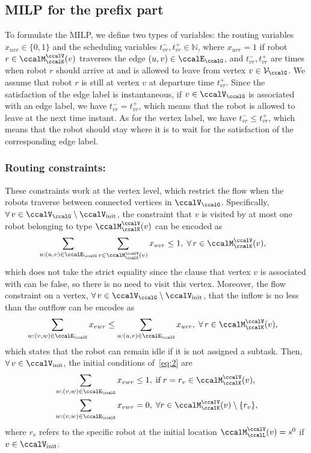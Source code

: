 \documentclass[Afour,sageh,times]{sagej}
\begin{document}
{{\subsection{MILP for the prefix part}\label{app:appendix_prefix_milp}
 To formulate the MILP, we define two types of variables: the routing variables $x_{uvr} \in\{0, 1\}$ and the scheduling variables $t^-_{vr}, t^+_{vr} \in \mathbb{N}$, where $x_{uvr}=1$  if robot  $r\in \ccalM^\ccalV_\ccalK(v)$ traverses the edge $(u,v) \in \ccalE_\ccalG$, and $t^-_{vr}, t^+_{vr}$ are times when robot $r$ should arrive at and is allowed to leave from vertex $v \in \mathcal{V}_\ccalG$. We assume that robot $r$ is still at vertex $v$ at departure time $t^+_{vr}$. Since the satisfaction of the edge label is instantaneous, if $v \in \ccalV_\ccalG$ is associated with an edge label, we have
  $t_{vr}^- = t_{vr}^+$, which means that the robot is allowed to leave at the next time instant. As for the vertex label, we have $t_{vr}^-  \leq t_{vr}^+$, which means that the robot should stay where it is to wait for the satisfaction of the corresponding edge label.

\subsubsection{Routing constraints:}\label{app:routing_constraints} These constraints work at the vertex level, which restrict the flow when the robots traverse between connected vertices in $\ccalV_\ccalG$. Specifically, $\forall\, v \in \ccalV_\ccalG\setminus\ccalV_{\text{init}}$, the constraint that  $v$ is visited by at most one robot belonging to type $\ccalM^\ccalV_{\ccalK}(v)$ can be encoded as
\begin{align}
   & \sum_{u:(u,v)\in \ccalE_\ccalG} \sum_{r\in \ccalM^\ccalV_{\ccalK}(v)} x_{uvr}  \leq 1, \;\forall\, r \in \ccalM^\ccalV_{\ccalK}(v), \label{eq:1}
\end{align}
which does not take the strict equality since the clause that vertex $v$ is associated with can be false, so there is no need to visit this vertex. Moreover, the flow constraint on a vertex, $\forall \,v \in \ccalV_\ccalG\setminus\ccalV_{\text{init}}$, that the inflow is no less than the outflow  can be encodes as
\begin{align}
& \sum_{w:(v,w)\in \ccalE_\ccalG} x_{vwr}   \leq  \sum_{u:(u,v)\in \ccalE_\ccalG} x_{uvr}, \;\forall\, r \in \ccalM^\ccalV_{\ccalK}(v), \label{eq:2}
\end{align}
which states that the robot can remain idle if it is not assigned a subtask. Then, $\forall \,v \in \ccalV_{\text{init}}$, the initial conditions of~\eqref{eq:2} are
\begin{subequations}\label{eq:2.5}
  \begin{align}
    & \sum_{w:(v,w)\in \ccalE_\ccalG} x_{vwr}  \leq 1, \;\text{if}\; r = r_v \in \ccalM^\ccalV_{\ccalK}(v), \label{eq:2.5a}\\
    & \sum_{w:(v,w)\in \ccalE_\ccalG} x_{vwr}  = 0, \;\forall r \in \ccalM^\ccalV_{\ccalK}(v)\setminus \{ r_v\}, \label{eq:2.5b}
  \end{align}
\end{subequations}
where $r_v$ refers to the specific robot at the initial location $\ccalM^\ccalV_{\ccalL}(v) = s^0$ if $v \in \ccalV_{\text{init}}$.
}}
\end{document}
